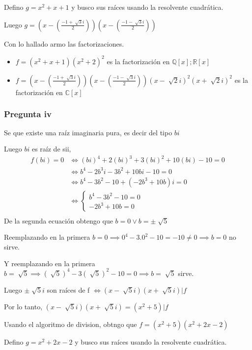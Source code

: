 Defino $ g = x^2+x+1 $ y busco sus raíces usando la resolvente cuadrática.

Luego $ g = (x-(\frac{-1+\sqrt[]{3}i}{2}))(x-(\frac{-1-\sqrt[]{3}i}{2})) $

Con lo hallado armo las factorizaciones.

\begin{itemize}
    \item $ f = (x^2+x+1)(x^2+2)^2 $ es la factorización en $ \mathbb{Q}[x]; \mathbb{R}[x] $
    \item $ f = (x-(\frac{-1+\sqrt[]{3}i}{2}))(x-(\frac{-1-\sqrt[]{3}i}{2}))(x-\sqrt[]{2}i)^2(x+\sqrt[]{2}i)^2 $ es la factorización en $ \mathbb{C}[x] $
\end{itemize}

\subsubsection{Pregunta iv}

Se que existe una raíz imaginaria pura, es decir del tipo $ bi $

Luego $ bi $ es raíz de sii,
\begin{align*}
    f(bi) = 0 &\iff (bi)^4 + 2(bi)^3 + 3(bi)^2 + 10(bi) - 10 = 0 \\
    &\iff b^4 - 2b^3i - 3b^2 + 10bi - 10 = 0 \\
    &\iff b^4 - 3b^2 - 10 + (- 2b^3  + 10b)i  = 0 \\
    &\iff \begin{cases}
        b^4 - 3b^2 - 10 = 0 \\
        - 2b^3  + 10b = 0
    \end{cases} \\
\end{align*}
De la segunda ecuación obtengo que $ b = 0 \vee b = \pm \sqrt[]{5} $

Reemplazando en la primera $ b = 0 \implies 0^4 - 3.0^2 - 10 = -10 \neq 0 \implies b= 0 $ no sirve.

Y reemplazando en la primera $ b = \sqrt[]{5} \implies (\sqrt[]{5})^4 - 3(\sqrt[]{5})^2 - 10 = 0 \implies b = \sqrt[]{5} $ sirve.

Luego $ \pm \sqrt[]{5}i $ son raíces de f $ \iff (x-\sqrt[]{5}i)(x+\sqrt[]{5}i) | f $

Por lo tanto, $ (x-\sqrt[]{5}i)(x+\sqrt[]{5}i) = (x^2+5) | f $

Usando el algoritmo de division, obtngo que $ f = (x^2+5)(x^2+2x-2) $

Defino $ g = x^2+2x-2 $ y busco sus raíces usando la resolvente cuadrática.

